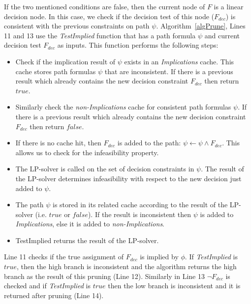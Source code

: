 \documentclass[twoside,11pt]{article}
\begin{document}
If the two mentioned conditions are false, then the current node of $F$ is a linear decision node. In this case, we check if the decision test of this node ($F_\mathit{dec}$) is consistent with the previous constraints on path $\psi$. 
Algorithm~\ref{algPrune}, Lines 11 and 13 use the \emph{TestImplied} function that has a  path formula  $\psi$ and current decision test $F_\mathit{dec}$ as inputs. This function performs the following steps:

\begin{itemize}
\item Check if the implication result of $\psi$ exists in an \emph{Implications} cache. This cache stores path formulas $\psi$ that are inconsistent. If there is a previous result which already contains the new decision constraint $F_\mathit{dec}$ then return $\mathit{true}$.
\item Similarly check the \emph{non-Implications} cache for consistent path formulas $\psi$. If there is a previous result which already contains the new decision constraint $F_\mathit{dec}$ then return $\mathit{false}$.
\item If there is no cache hit, then $F_\mathit{dec}$ is added to the path: $\psi \longleftarrow \psi \wedge F_\mathit{dec}$. This allows us to check for the infeasibility property.
\item The LP-solver is called on the set of decision constraints in $\psi$. The result of the LP-solver determines infeasibility with respect to the new decision just added to $\psi$. 
\item The path $\psi$ is stored in its related cache according to the result of the LP-solver (i.e. $\mathit{true}$ or $\mathit{false}$). If the result is inconsistent then $\psi$ is added to \emph{Implications}, else it is added to \emph{non-Implications}.
\item TestImplied returns the result of the LP-solver.
\end{itemize}
Line 11 checks if the true assignment of $F_\mathit{dec}$ is implied by $\phi$. If   \emph{TestImplied} is $\mathit{true}$, then the high branch is inconsistent and the algorithm returns the high branch as the result of this pruning (Line 12). Similarly in Line 13 $\neg F_\mathit{dec}$ is checked and if \emph{TestImplied} is $\mathit{true}$ then the low branch is inconsistent and it is returned after pruning (Line 14). 
\end{document}
